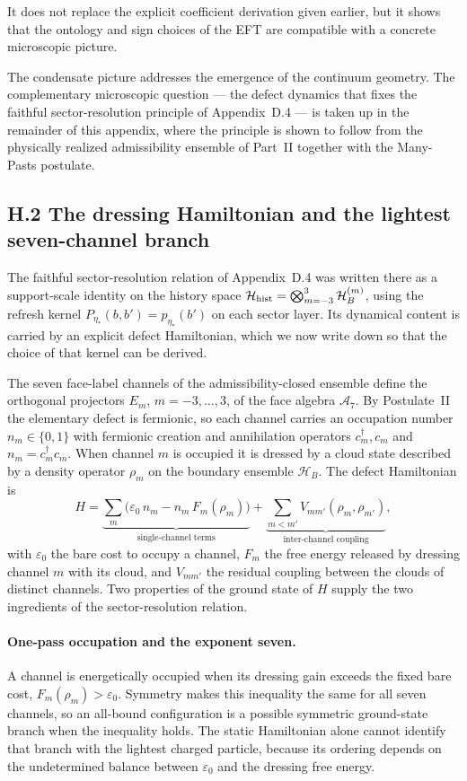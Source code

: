 \documentclass[11pt]{article}
\begin{document}
It does not replace the explicit coefficient derivation given earlier, but it shows that the ontology and sign choices of the EFT are compatible with a concrete microscopic picture.

The condensate picture addresses the emergence of the continuum geometry. The complementary microscopic question --- the defect dynamics that fixes the faithful sector-resolution principle of Appendix~D.4 --- is taken up in the remainder of this appendix, where the principle is shown to follow from the physically realized admissibility ensemble of Part~II together with the Many-Pasts postulate.

\subsection*{H.2 The dressing Hamiltonian and the lightest seven-channel branch}

The faithful sector-resolution relation of Appendix~D.4 was written there as a support-scale identity on the history space $\mathcal H_{\rm hist}=\bigotimes_{m=-3}^{3}\mathcal H_B^{(m)}$, using the refresh kernel $P_{\eta_*}(b,b')=p_{\eta_*}(b')$ on each sector layer. Its dynamical content is carried by an explicit defect Hamiltonian, which we now write down so that the choice of that kernel can be derived.

The seven face-label channels of the admissibility-closed ensemble define the orthogonal projectors $E_m$, $m=-3,\ldots,3$, of the face algebra $\mathcal A_7$. By Postulate~II the elementary defect is fermionic, so each channel carries an occupation number $n_m\in\{0,1\}$ with fermionic creation and annihilation operators $c_m^\dagger,c_m$ and $n_m=c_m^\dagger c_m$. When channel $m$ is occupied it is dressed by a cloud state described by a density operator $\rho_m$ on the boundary ensemble $\mathcal H_B$. The defect Hamiltonian is
\[
H
=
\underbrace{\sum_{m}\bigl(\varepsilon_0\,n_m-n_m\,F_m(\rho_m)\bigr)}_{\text{single-channel terms}}
+
\underbrace{\sum_{m<m'}V_{mm'}(\rho_m,\rho_{m'})}_{\text{inter-channel coupling}},
\]
with $\varepsilon_0$ the bare cost to occupy a channel, $F_m$ the free energy released by dressing channel $m$ with its cloud, and $V_{mm'}$ the residual coupling between the clouds of distinct channels. Two properties of the ground state of $H$ supply the two ingredients of the sector-resolution relation.

\paragraph{One-pass occupation and the exponent seven.}
A channel is energetically occupied when its dressing gain exceeds the fixed bare cost, $F_m(\rho_m)>\varepsilon_0$. Symmetry makes this inequality the same for all seven channels, so an all-bound configuration is a possible symmetric ground-state branch when the inequality holds. The static Hamiltonian alone cannot identify that branch with the lightest charged particle, because its ordering depends on the undetermined balance between $\varepsilon_0$ and the dressing free energy.
\end{document}
